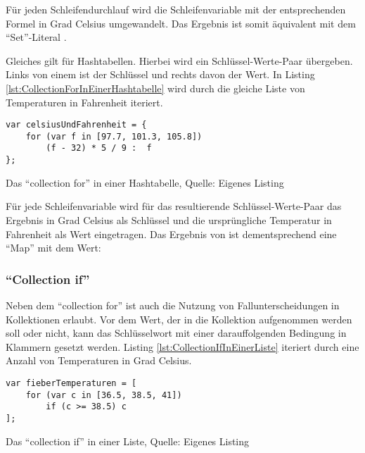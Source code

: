 Für jeden Schleifendurchlauf wird die Schleifenvariable  mit der entsprechenden Formel in Grad Celsius umgewandelt.
Das Ergebnis ist somit äquivalent mit dem \enquote{Set}-Literal .



Gleiches gilt für Hashtabellen.
Hierbei wird ein Schlüssel-Werte-Paar übergeben.
Links von einem \IC{:} ist der Schlüssel und rechts davon der Wert.
In Listing \ref{lst:CollectionForInEinerHashtabelle}
wird durch  die gleiche Liste von Temperaturen in Fahrenheit iteriert.


\ifIncludeFigures
  \begin{listing}[ht]
    \begin{verbatim}
var celsiusUndFahrenheit = {
    for (var f in [97.7, 101.3, 105.8])
        (f - 32) * 5 / 9 :  f
};
\end{verbatim}
    \caption[Das \enquote{collection for} in einer Hashtabelle]{Das \enquote{collection for} in einer Hashtabelle, Quelle: Eigenes Listing}
    \label{lst:CollectionForInEinerHashtabelle}
  \end{listing}
\fi

Für jede Schleifenvariable  wird für das resultierende Schlüssel-Werte-Paar das Ergebnis in Grad Celsius als Schlüssel und die ursprüngliche Temperatur in Fahrenheit als Wert eingetragen. 
Das Ergebnis von  ist dementsprechend eine \enquote{Map} mit dem Wert: 



\subsubsection{\enquote{Collection if}}

Neben dem \enquote{collection for} ist auch die Nutzung von Fallunterscheidungen in Kollektionen erlaubt.
Vor dem Wert, der in die Kollektion aufgenommen werden soll oder nicht,  kann  das Schlüsselwort  mit einer darauffolgenden Bedingung in Klammern gesetzt werden.
Listing \ref{lst:CollectionIfInEinerListe} iteriert durch eine Anzahl von Temperaturen in Grad Celsius.


\ifIncludeFigures
  \begin{listing}[ht]
    \begin{verbatim}
var fieberTemperaturen = [
    for (var c in [36.5, 38.5, 41])
        if (c >= 38.5) c
];
\end{verbatim}
    \caption[\enquote{Collection if} in einer Liste]{Das \enquote{collection if} in einer Liste, Quelle: Eigenes Listing}
    \label{lst:CollectionIfInEinerListe}
  \end{listing}
\fi

